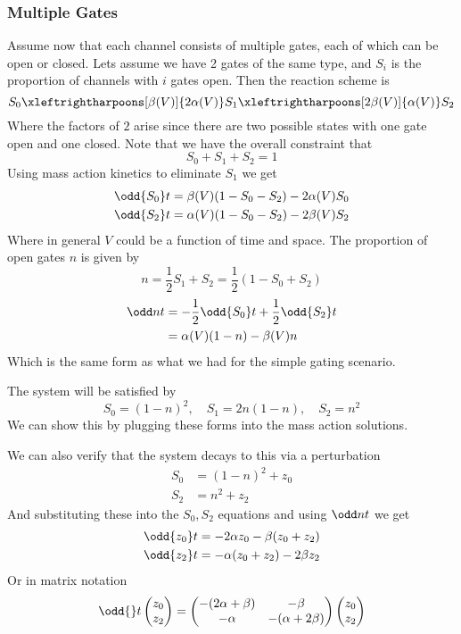 \documentclass{X:/Documents/Coding/Latex/myassignment}
\begin{document}
\subsubsection{Multiple Gates}
Assume now that each channel consists of multiple gates, each of which can be open or closed.
Lets assume we have 2 gates of the same type, and $S_i$ is the proportion of channels with $i$ gates open. Then the reaction scheme is
\[S_0 \xleftrightharpoons[\beta(V)]{2\alpha(V)} S_1 \xleftrightharpoons[2 \beta(V)]{\alpha(V)} S_2\]
Where the factors of $2$ arise since there are two possible states with one gate open and one closed. Note that we have the overall constraint that 
\[S_0 + S_1 + S_2 = 1\]
Using mass action kinetics to eliminate $S_1$ we get
\begin{align*}
	\odd {S_0}t &= \beta(V) (1-S_0-S_2) - 2 \alpha(V) S_0\\
	\odd {S_2}t &= \alpha(V) (1-S_0-S_2) - 2 \beta(V) S_2
\end{align*}
Where in general $V$ could be a function of time and space. 
The proportion of open gates $n$ is given by
\[n = \frac12 S_1 + S_2 = \frac12(1-S_0+S_2)\]
\begin{align*}
	\odd nt &= -\frac12 \odd {S_0}t + \frac12\odd{S_2}t\\
	&= \alpha(V) (1-n) - \beta(V) n
\end{align*}
Which is the same form as what we had for the simple gating scenario.

The system will be satisfied by 
\[S_0 = (1-n)^2,\quad S_1 = 2n(1-n),\quad S_2 = n^2\]
We can show this by plugging these forms into the mass action solutions.

We can also verify that the system decays to this via a perturbation
\begin{align*}
	S_0 &= (1-n)^2 + z_0\\
	S_2 &= n^2 + z_2
\end{align*}
And substituting these into the $S_0,S_2$ equations and using $\odd nt$ we get
\begin{align*}
	\odd{z_0}t = -2 \alpha z_0 - \beta(z_0+ z_2)\\
	\odd{z_2}t = -\alpha(z_0+z_2) - 2 \beta z_2
\end{align*}
Or in matrix notation
\[\odd{}t \begin{pmatrix}
	z_0\\z_2
\end{pmatrix} = \begin{pmatrix}
	-(2 \alpha+ \beta) & -\beta\\
	-\alpha & -(\alpha + 2 \beta)
\end{pmatrix} \begin{pmatrix}
	z_0\\z_2
\end{pmatrix}\]
\end{document}
